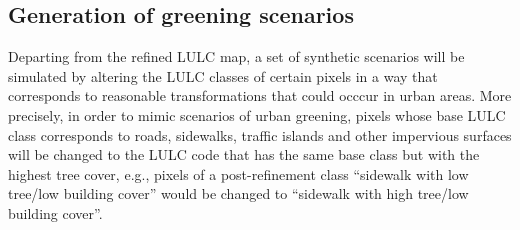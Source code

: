 \documentclass[10pt,letterpaper]{article}
\begin{document}
\subsection*{Generation of greening scenarios}

Departing from the refined LULC map, a set of synthetic scenarios will be simulated by altering the LULC classes of certain pixels in a way that corresponds to reasonable transformations that could occcur in urban areas.
More precisely, in order to mimic scenarios of urban greening, pixels whose base LULC class corresponds to roads, sidewalks, traffic islands and other impervious surfaces will be changed to the LULC code that has the same base class but with the highest tree cover, e.g.,  pixels of a post-refinement class ``sidewalk with low tree/low building cover'' would be changed to ``sidewalk with high tree/low building cover''.
\end{document}

